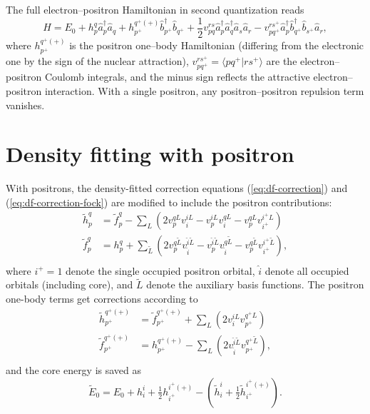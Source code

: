 \documentclass[a4paper,12pt,oneside]{book}
\newcommand{\op}{\hat}
\newcommand{\pos}[1]{{#1}^{+}}
\begin{document}
The full electron--positron Hamiltonian in second quantization reads
\begin{equation}
\op H = E_0 + h_p^q \op a^\dagger_p \op a_q
+ h_{\pos{p}}^{\pos{q}(\mathbf{+})} \op b^\dagger_{\pos{p}} \op b_{\pos{q}}
+ \frac{1}{2} v_{pq}^{rs} \op a^\dagger_p \op a^\dagger_q \op a_s \op a_r
- v_{p\pos{q}}^{r\pos{s}} \op a^\dagger_p \op b^\dagger_{\pos{q}} \op b_{\pos{s}} \op a_r,
\end{equation}
where $h_{\pos{p}}^{\pos{q}(\mathbf{+})}$ is the positron one--body Hamiltonian
(differing from the electronic one by the sign of the nuclear attraction),
$v_{p\pos{q}}^{r\pos{s}} = \langle p\pos{q}|r\pos{s}\rangle$ are the
electron--positron Coulomb integrals,
and the minus sign reflects the attractive electron--positron interaction.
With a single positron, any positron--positron repulsion term vanishes.

\section{Density fitting with positron}

With positrons, the density-fitted correction equations (\ref{eq:df-correction}) and (\ref{eq:df-correction-fock}) are modified to include the positron contributions:
\begin{equation}
  \begin{aligned}
    \tilde h_p^q &= \tilde f_p^q 
    - \sum_L \left(2v_{p}^{qL} v_{i}^{iL} - v_{p}^{iL} v_{i}^{qL} - v_{p}^{qL} v_{\pos{i}}^{\pos{i}L}
    \right)\\
    \tilde{f}_p^q &= h_p^q + \sum_{\tilde{L}} \left(2v_{p}^{q\tilde L} v_{\hat i}^{\hat i\tilde L} 
    - v_{p}^{\hat i\tilde L} v_{\hat i}^{q\tilde L} - v_{p}^{q\tilde L} v_{\pos{i}}^{\pos{i}\tilde L} \right),\\
  \end{aligned}
\end{equation}
where $\pos{i}=1$ denote the single occupied positron orbital,
$\hat i$ denote all occupied orbitals (including core), 
and $\tilde L$ denote the auxiliary basis functions. 
The positron one-body terms get corrections according to 
\begin{equation}
  \begin{aligned}
    \tilde h_{\pos{p}}^{\pos{q} (\mathbf{+})} &= \tilde f_{\pos{p}}^{\pos{q} (\mathbf{+})} 
    + \sum_L \left(2v_{i}^{iL}v_{\pos{p}}^{\pos{q}L}\right)\\
    \tilde f_{\pos{p} }^{\pos{q} (\mathbf{+})} &= h_{\pos{p}}^{\pos{q} (\mathbf{+})} - \sum_L \left(2v_{ \hat i}^{ \hat i \tilde L}v_{\pos{p}}^{\pos{q} \tilde L}\right), 
    \\
  \end{aligned}
\end{equation}
and the core energy is saved as
\begin{equation}
\tilde{E}_0 = E_0 + h_{i}^{i} + \tfrac12 h^{\pos{i}(\mathbf{+})}_{\pos{i}} - \left( \tilde h_{ i}^{ i} + \tfrac12 \tilde h^{\pos{i}(\mathbf{+})}_{\pos{i}}  \right).
\end{equation}
\end{document}
